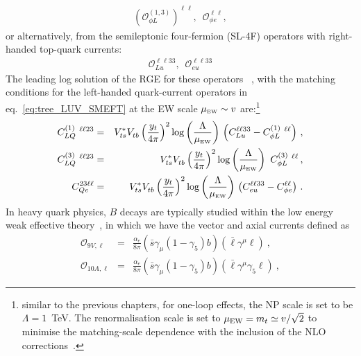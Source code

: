 \begin{eqnarray} 
	\label{eq:SMEFT_op_HL}
	(	\mathcal{O}_{\phi L}^{(1,3)})^{\ell \ell},	\,\,\, 	\mathcal{O}_{\phi e}^{\ell \ell},
\end{eqnarray}
or alternatively, from the semileptonic four-fermion (SL-4F) operators with right-handed top-quark currents:
\begin{eqnarray} 
	\label{eq:SMEFT_op_loop_lu}
		\mathcal{O}_{Lu}^{\ell \ell 3 3}, \,	\,\,	\mathcal{O}_{eu}^{\ell \ell 3 3} 
\end{eqnarray}
The leading log solution of the RGE for these operators ~\cite{Jenkins:2013zja,Jenkins:2013wua}, with the matching conditions for the left-handed quark-current operators in eq.~\eqref{eq:tree_LUV_SMEFT} at the  EW scale $\mu_{\textrm{\tiny{EW}}}\sim v $ are:\footnote{similar to the previous chapters, for one-loop effects,  the NP scale is set to be $\Lambda = 1$~TeV.  The renormalisation scale is set to $\mu_{\rm EW} = m_t\simeq v/\sqrt{2}$ to minimise the matching-scale dependence with the inclusion of the NLO	 corrections~\cite{Aebischer:2015fzz,Bobeth:2017xry}.}
\begin{eqnarray}
	\label{eq:SMEFT_matching_1loop}
	C_{LQ}^{(1)}\ ^{\ell \ell 23} &=& V_{ts}^{*} V^{ }_{tb} \left(\frac{y_{t} }{4 \pi}\right)^2 \log \left( \frac{\Lambda}{\mu_{\textrm{\tiny{EW}}}} \right)   \, \left(C_{Lu}^{\ell \ell 3 3} - C_{\phi L}^{(1)}\ ^{\ell \ell} \right)\,,\nonumber \\
		C_{LQ}^{(3)}\ ^{\ell \ell 23} &=& V_{ts}^{*} V^{ }_{tb} \left(\frac{y_{t} }{4 \pi}\right)^2 \log \left( \frac{\Lambda}{\mu_{\textrm{\tiny{EW}}}} \right)  \ C_{\phi L}^{(3)}\ ^{\ell \ell}  \,,\nonumber \\
	C_{Qe}^{23\ell \ell} &=& V_{ts}^{*} V^{ }_{tb} \left(\frac{y_{t} }{4 \pi}\right)^2 \log \left( \frac{\Lambda}{\mu_{\textrm{\tiny{EW}}}} \right)   \, \left( C_{eu}^{\ell \ell 3 3} - C^{\ell \ell}_{\phi e}\right) \, .
\end{eqnarray}
In heavy quark physics, $B$ decays are typically studied within the low energy weak effective theory~\cite{Buchalla:1995vs,Buras:1998raa,Silvestrini:2019sey}, in which we have the vector and axial currents defined as
\begin{eqnarray}
	\label{eq:_Q9_Q10}
	\mathcal{O}_{9 V, \ell} & = & \frac{\alpha_{e}}{8 \pi} (\bar{s} \gamma_{\mu} (1-\gamma_{5})b) ( \bar{\ell} \gamma^{\mu} \ell ) \nonumber \ , \ \\
	\mathcal{O}_{10 A, \ell} & = & \frac{\alpha_{e}}{8 \pi} (\bar{s} \gamma_{\mu} (1-\gamma_{5})b) ( \bar{\ell} \gamma^{\mu} \gamma_{5} \ell ) \ ,
\end{eqnarray}
